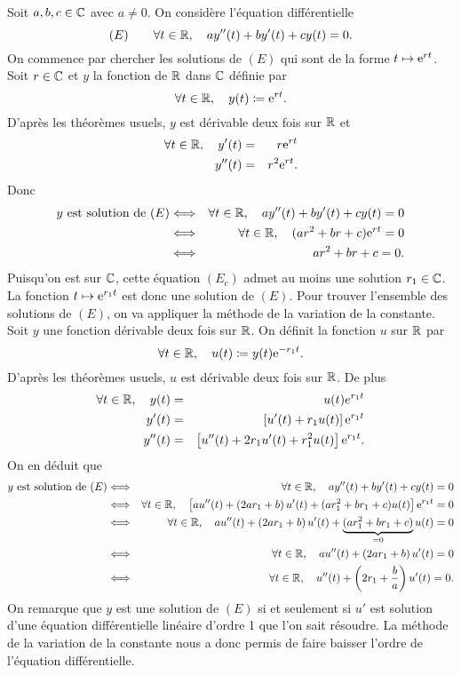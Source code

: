 \documentclass{magnolia}
\begin{document}
\begin{preuve}
\begin{francois}
Soit $a, b, c\in\mathbb{C}$ avec $a\neq 0$. On considère l'équation différentielle
\[(E)\qquad \forall t\in\mathbb{R} ,\quad a y''(t)+by'(t)+cy(t)=0.\]
On commence par chercher les solutions de $(E)$ qui sont de la forme $t\mapsto{\rm e}^{r t}$. Soit $r\in\mathbb{C}$ et $y$ la fonction de $\mathbb{R}$ dans $\mathbb{C}$ définie par
\[\forall t\in\mathbb{R},\quad y(t)\coloneqq{\rm e}^{rt}.\]
D'après les théorèmes usuels, $y$ est dérivable deux fois sur $\mathbb{R}$ et
\begin{eqnarray*}
\forall t\in\mathbb{R},\quad y'(t)&=&r{\rm e}^{rt}\\
y''(t)&=&r^2{\rm e}^{rt}.
\end{eqnarray*}
Donc
\begin{eqnarray*}
\text{$y$ est solution de $(E)$}
&\Longleftrightarrow& \forall t\in\mathbb{R} ,\quad a y''(t)+by'(t)+cy(t)=0\\
&\Longleftrightarrow& \forall t\in \mathbb{R},\quad (ar^2+br+c){\rm e}^{rt}=0\\
&\Longleftrightarrow& ar^2+br+c=0.
\end{eqnarray*}
Puisqu'on est sur $\mathbb{C}$, cette équation $(E_c)$ admet au moins une solution $r_1\in\mathbb{C}$. La fonction $t\mapsto {\rm e}^{r_1 t}$ est donc une solution de $(E)$. Pour trouver l'ensemble des solutions de $(E)$, on va appliquer la méthode de la variation de la constante. Soit $y$ une fonction dérivable deux fois sur $\mathbb{R}$. On définit la fonction $u$ sur $\mathbb{R}$ par
\[\forall t\in\mathbb{R},\quad u(t)\coloneqq y(t){\rm e}^{-r_1 t}.\]
D'après les théorèmes usuels, $u$ est dérivable deux fois sur $\mathbb{R}$. De plus
\begin{eqnarray*}
\forall t\in\mathbb{R},\quad y(t)&=&u(t)e^{r_1 t}\\
y'(t)&=&\left[u'(t)+r_1 u(t)\right]{\rm e}^{r_1 t}\\
y''(t)&=&\left[u''(t)+2r_1 u'(t)+r_1^2 u(t)\right]{\rm e}^{r_1 t}.
\end{eqnarray*}
On en déduit que
\begin{eqnarray*}
\text{$y$ est solution de $(E)$}
&\Longleftrightarrow& \forall t\in\mathbb{R} ,\quad a y''(t)+by'(t)+cy(t)=0\\
&\Longleftrightarrow& \forall t\in \mathbb{R},\quad \left[a u''(t)+\left(2ar_1+b\right)u'(t)+(ar_1^2+br_1+c)u(t)\right]{\rm e}^{r_1 t}=0\\
&\Longleftrightarrow& \forall t\in \mathbb{R},\quad a u''(t)+\left(2ar_1+b\right)u'(t)+\underbrace{(ar_1^2+br_1+c)}_{=0}u(t)=0\\
&\Longleftrightarrow& \forall t\in \mathbb{R},\quad a u''(t)+\left(2ar_1+b\right)u'(t)=0\\
&\Longleftrightarrow& \forall t\in \mathbb{R},\quad u''(t)+\left(2r_1+\frac{b}{a}\right)u'(t)=0.
\end{eqnarray*}
On remarque que $y$ est une solution de $(E)$ si et seulement si $u'$ est solution d'une équation différentielle linéaire d'ordre 1 que l'on sait résoudre. La méthode de la variation de la constante nous a donc permis de faire baisser l'ordre de l'équation différentielle.

\end{francois}
\end{preuve}
\end{document}
